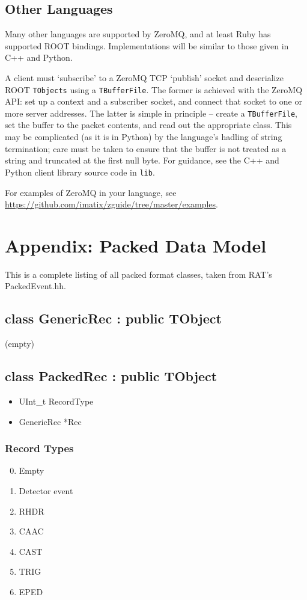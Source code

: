 \documentclass{article}
\begin{document}
\subsection{Other Languages}

Many other languages are supported by ZeroMQ, and at least Ruby has supported ROOT bindings. Implementations will be similar to those given in C++ and Python. 

A client must `subscribe' to a ZeroMQ TCP `publish' socket and deserialize ROOT {\tt TObjects} using a {\tt TBufferFile}. The former is achieved with the ZeroMQ API: set up a context and a subscriber socket, and connect that socket to one or more server addresses. The latter is simple in principle -- create a {\tt TBufferFile}, set the buffer to the packet contents, and read out the appropriate class. This may be complicated (as it is in Python) by the language's hadling of string termination; care must be taken to ensure that the buffer is not treated as a string and truncated at the first null byte. For guidance, see the C++ and Python client library source code in {\tt lib}.

For examples of ZeroMQ in your language, see \href{https://github.com/imatix/zguide/tree/master/examples}{https://github.com/imatix/zguide/tree/master/examples}.

\clearpage
\section{Appendix: Packed Data Model}
This is a complete listing of all packed format classes, taken from RAT's PackedEvent.hh.

\subsection{class GenericRec : public TObject}
(empty)

\subsection{class PackedRec : public TObject}
\begin{itemize}
\item UInt\_t RecordType
\item GenericRec *Rec
\end{itemize}

\subsubsection{Record Types}
\begin{enumerate}
\setcounter{enumi}{-1}
\item Empty
\item Detector event
\item RHDR
\item CAAC
\item CAST
\item TRIG
\item EPED
\end{enumerate}
\end{document}
